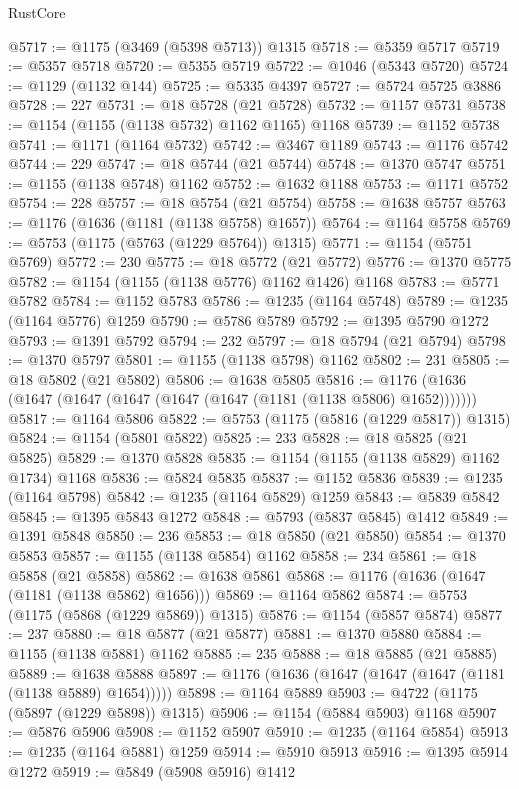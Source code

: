\begin{lexlean}{RustCore}
\begin{coremodule}
@5717 := @1175 (@3469 (@5398 @5713)) @1315
@5718 := @5359 @5717
@5719 := @5357 @5718
@5720 := @5355 @5719
@5722 := @1046 (@5343 @5720)
@5724 := @1129 (@1132 @144)
@5725 := @5335 @4397
@5727 := @5724 @5725 @3886
@5728 := 227
@5731 := @18 @5728 (@21 @5728)
@5732 := @1157 @5731
@5738 := @1154 (@1155 (@1138 @5732) @1162 @1165) @1168
@5739 := @1152 @5738
@5741 := @1171 (@1164 @5732)
@5742 := @3467 @1189
@5743 := @1176 @5742
@5744 := 229
@5747 := @18 @5744 (@21 @5744)
@5748 := @1370 @5747
@5751 := @1155 (@1138 @5748) @1162
@5752 := @1632 @1188
@5753 := @1171 @5752
@5754 := 228
@5757 := @18 @5754 (@21 @5754)
@5758 := @1638 @5757
@5763 := @1176 (@1636 (@1181 (@1138 @5758) @1657))
@5764 := @1164 @5758
@5769 := @5753 (@1175 (@5763 (@1229 @5764)) @1315)
@5771 := @1154 (@5751 @5769)
@5772 := 230
@5775 := @18 @5772 (@21 @5772)
@5776 := @1370 @5775
@5782 := @1154 (@1155 (@1138 @5776) @1162 @1426) @1168
@5783 := @5771 @5782
@5784 := @1152 @5783
@5786 := @1235 (@1164 @5748)
@5789 := @1235 (@1164 @5776) @1259
@5790 := @5786 @5789
@5792 := @1395 @5790 @1272
@5793 := @1391 @5792
@5794 := 232
@5797 := @18 @5794 (@21 @5794)
@5798 := @1370 @5797
@5801 := @1155 (@1138 @5798) @1162
@5802 := 231
@5805 := @18 @5802 (@21 @5802)
@5806 := @1638 @5805
@5816 := @1176 (@1636 (@1647 (@1647 (@1647 (@1647 (@1647 (@1181 (@1138 @5806) @1652)))))))
@5817 := @1164 @5806
@5822 := @5753 (@1175 (@5816 (@1229 @5817)) @1315)
@5824 := @1154 (@5801 @5822)
@5825 := 233
@5828 := @18 @5825 (@21 @5825)
@5829 := @1370 @5828
@5835 := @1154 (@1155 (@1138 @5829) @1162 @1734) @1168
@5836 := @5824 @5835
@5837 := @1152 @5836
@5839 := @1235 (@1164 @5798)
@5842 := @1235 (@1164 @5829) @1259
@5843 := @5839 @5842
@5845 := @1395 @5843 @1272
@5848 := @5793 (@5837 @5845) @1412
@5849 := @1391 @5848
@5850 := 236
@5853 := @18 @5850 (@21 @5850)
@5854 := @1370 @5853
@5857 := @1155 (@1138 @5854) @1162
@5858 := 234
@5861 := @18 @5858 (@21 @5858)
@5862 := @1638 @5861
@5868 := @1176 (@1636 (@1647 (@1181 (@1138 @5862) @1656)))
@5869 := @1164 @5862
@5874 := @5753 (@1175 (@5868 (@1229 @5869)) @1315)
@5876 := @1154 (@5857 @5874)
@5877 := 237
@5880 := @18 @5877 (@21 @5877)
@5881 := @1370 @5880
@5884 := @1155 (@1138 @5881) @1162
@5885 := 235
@5888 := @18 @5885 (@21 @5885)
@5889 := @1638 @5888
@5897 := @1176 (@1636 (@1647 (@1647 (@1647 (@1181 (@1138 @5889) @1654)))))
@5898 := @1164 @5889
@5903 := @4722 (@1175 (@5897 (@1229 @5898)) @1315)
@5906 := @1154 (@5884 @5903) @1168
@5907 := @5876 @5906
@5908 := @1152 @5907
@5910 := @1235 (@1164 @5854)
@5913 := @1235 (@1164 @5881) @1259
@5914 := @5910 @5913
@5916 := @1395 @5914 @1272
@5919 := @5849 (@5908 @5916) @1412

\end{coremodule}
\end{lexlean}
